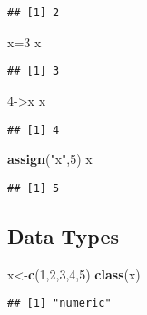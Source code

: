 \documentclass[
]{article}
\newenvironment{Shaded}{\begin{snugshade}}{\end{snugshade}}
\newcommand{\DecValTok}[1]{\textcolor[rgb]{0.00,0.00,0.81}{#1}}
\newcommand{\FunctionTok}[1]{\textcolor[rgb]{0.13,0.29,0.53}{\textbf{#1}}}
\newcommand{\NormalTok}[1]{#1}
\newcommand{\OtherTok}[1]{\textcolor[rgb]{0.56,0.35,0.01}{#1}}
\newcommand{\StringTok}[1]{\textcolor[rgb]{0.31,0.60,0.02}{#1}}
\begin{document}
\begin{verbatim}
## [1] 2
\end{verbatim}

\begin{Shaded}
\begin{Highlighting}[]
\NormalTok{x}\OtherTok{=}\DecValTok{3}
\NormalTok{x}
\end{Highlighting}
\end{Shaded}

\begin{verbatim}
## [1] 3
\end{verbatim}

\begin{Shaded}
\begin{Highlighting}[]
\DecValTok{4}\OtherTok{{-}\textgreater{}}\NormalTok{x}
\NormalTok{x}
\end{Highlighting}
\end{Shaded}

\begin{verbatim}
## [1] 4
\end{verbatim}

\begin{Shaded}
\begin{Highlighting}[]
\FunctionTok{assign}\NormalTok{(}\StringTok{"x"}\NormalTok{,}\DecValTok{5}\NormalTok{)}
\NormalTok{x}
\end{Highlighting}
\end{Shaded}

\begin{verbatim}
## [1] 5
\end{verbatim}

\subsection{Data Types}\label{data-types}

\begin{Shaded}
\begin{Highlighting}[]
\NormalTok{x}\OtherTok{\textless{}{-}}\FunctionTok{c}\NormalTok{(}\DecValTok{1}\NormalTok{,}\DecValTok{2}\NormalTok{,}\DecValTok{3}\NormalTok{,}\DecValTok{4}\NormalTok{,}\DecValTok{5}\NormalTok{)}
\FunctionTok{class}\NormalTok{(x)}
\end{Highlighting}
\end{Shaded}

\begin{verbatim}
## [1] "numeric"
\end{verbatim}
\end{document}
